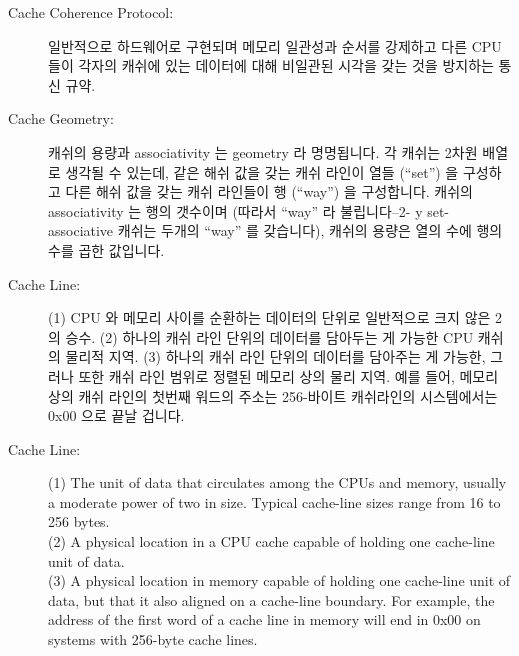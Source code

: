 \begin{description}
\item[Cache Coherence Protocol:]
	일반적으로 하드웨어로 구현되며 메모리 일관성과 순서를 강제하고 다른 CPU
	들이 각자의 캐쉬에 있는 데이터에 대해 비일관된 시각을 갖는 것을
	방지하는 통신 규약.
\item[Cache Geometry:]
	캐쉬의 용량과 associativity 는 geometry 라 명명됩니다.
	각 캐쉬는 2차원 배열로 생각될 수 있는데, 같은 해쉬 값을 갖는 캐쉬
	라인이 열들 (``set'') 을 구성하고 다른 해쉬 값을 갖는 캐쉬 라인들이 행
	(``way'') 을 구성합니다. 
	캐쉬의 associativity 는 행의 갯수이며 (따라서 ``way'' 라
	불립니다--2- y set-associative 캐쉬는 두개의 ``way'' 를 갖습니다),
	캐쉬의 용량은 열의 수에 행의 수를 곱한 값입니다.

\iffalse

\item[Cache Coherence Protocol:]\index{Cache coherence protocol}
	A communications protocol, normally implemented in hardware,
	that enforces memory consistency and ordering, preventing
	different CPUs from seeing inconsistent views of data held
	in their caches.
\item[Cache Geometry:]\index{Cache geometry}
	The size and associativity of a cache is termed its geometry.
	Each cache may be thought of as a two-dimensional array,
	with rows of cache lines (``sets'') that have the same hash
	value, and columns of cache lines (``ways'') in which every
	cache line has a different hash value.
	The associativity of a given cache is its number of
	columns (hence the name ``way''---a two-way set-associative
	cache has two ``ways''), and the size of the cache is its
	number of rows multiplied by its number of columns.

\fi

\item[Cache Line:]
	(1) CPU 와 메모리 사이를 순환하는 데이터의 단위로 일반적으로 크지 않은
	2의 승수.
	(2) 하나의 캐쉬 라인 단위의 데이터를 담아두는 게 가능한 CPU 캐쉬의
	물리적 지역.
	(3) 하나의 캐쉬 라인 단위의 데이터를 담아주는 게 가능한, 그러나 또한
	캐쉬 라인 범위로 정렬된 메모리 상의 물리 지역.
	예를 들어, 메모리 상의 캐쉬 라인의 첫번째 워드의 주소는 256-바이트
	캐쉬라인의 시스템에서는 0x00 으로 끝날 겁니다.

\iffalse

\item[Cache Line:]
	(1) The unit of data that circulates among the CPUs and memory,
	usually a moderate power of two in size.
	Typical cache-line sizes range from 16 to 256 bytes. \\
	(2) A physical location in a CPU cache capable of holding
	one cache-line unit of data. \\
	(3) A physical location in memory capable of holding one
	cache-line unit of data, but that it also aligned
	on a cache-line boundary.
	For example, the address of the first word of a cache line
	in memory will end in 0x00 on systems with 256-byte cache lines.


\end{description}
